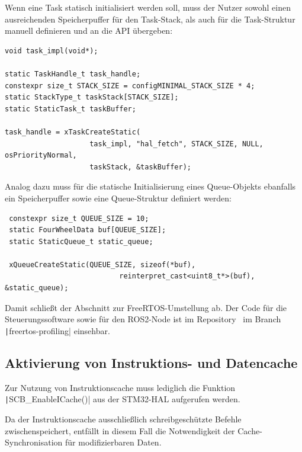 Wenn eine Task statisch initialisiert werden soll, muss der Nutzer sowohl einen
ausreichenden Speicherpuffer für den Task-Stack, als auch für die Task-Struktur
manuell definieren und an die API übergeben:

\begin{code}
\begin{verbatim}
void task_impl(void*);

static TaskHandle_t task_handle;
constexpr size_t STACK_SIZE = configMINIMAL_STACK_SIZE * 4;
static StackType_t taskStack[STACK_SIZE];
static StaticTask_t taskBuffer;

task_handle = xTaskCreateStatic(
                    task_impl, "hal_fetch", STACK_SIZE, NULL, osPriorityNormal,
                    taskStack, &taskBuffer);
\end{verbatim}
\end{code}

Analog dazu muss für die statische Initialisierung eines Queue-Objekts ebanfalls
ein Speicherpuffer sowie eine Queue-Struktur definiert werden:

\begin{code}
\begin{verbatim}
 constexpr size_t QUEUE_SIZE = 10;
 static FourWheelData buf[QUEUE_SIZE];
 static StaticQueue_t static_queue;

 xQueueCreateStatic(QUEUE_SIZE, sizeof(*buf),
                           reinterpret_cast<uint8_t*>(buf), &static_queue);
\end{verbatim}
\end{code}

Damit schließt der Abschnitt zur FreeRTOS-Umstellung ab. Der Code für die
Steuerungssoftware sowie für den ROS2-Node ist im
Repository~\cite{mecarover_freertos_profiling} im Branch
\linebreak\texttt|freertos-profiling| einsehbar.

\subsection{Aktivierung von Instruktions- und Datencache}

Zur Nutzung von Instruktionscache muss lediglich die Funktion
\texttt|SCB_EnableICache()| aus der STM32-HAL aufgerufen werden.

Da der Instruktionscache ausschließlich schreibgeschützte Befehle
zwischenspeichert, entfällt in diesem Fall die Notwendigkeit der
Cache-Synchronisation für modifizierbaren Daten.

